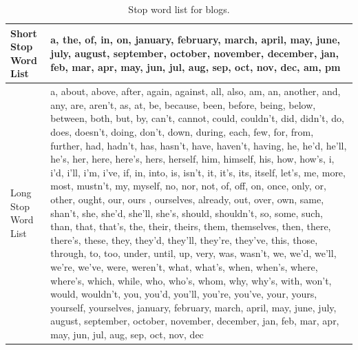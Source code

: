 \documentclass{sig-alternate}
\begin{document}
\begin{table}[ht]
\begin{center}
\begin{tabular}{p{0.7cm}|p{7.6cm}}

\hline

\hline
Short Stop Word List & a, the, of, in, on, january, february, march, april, may, june, july, august, september, october, november, december, jan, feb, mar, apr, may, jun, jul, aug, sep, oct, nov, dec, am, pm \\
\hline
Long Stop Word List & a, about, above, after, again, against, all, also, am, an, another, and, any, are, aren't, as, at, be, because, been, before, being, below, between, both, but, by, can't, cannot, could, couldn't, did, didn't, do, does, doesn't, doing, don't, down, during, each, few, for, from, further, had, hadn't, has, hasn't, have, haven't, having, he, he'd, he'll, he's, her, here, here's, hers, herself, him, himself, his, how, how's, i, i'd, i'll, i'm, i've, if, in, into, is, isn't, it, it's, its, itself, let's, me, more, most, mustn't, my, myself, no, nor, not, of, off, on, once, only, or, other, ought, our, ours , ourselves, already, out, over, own, same, shan't, she, she'd, she'll, she's, should, shouldn't, so, some, such, than, that, that's, the, their, theirs, them, themselves, then, there, there's, these, they, they'd, they'll, they're, they've, this, those, through, to, too, under, until, up, very, was, wasn't, we, we'd, we'll, we're, we've, were, weren't, what, what's, when, when's, where, where's, which, while, who, who's, whom, why, why's, with, won't, would, wouldn't, you, you'd, you'll, you're, you've, your, yours, yourself, yourselves, january, february, march, april, may, june, july, august, september, october, november, december, jan, feb, mar, apr, may, jun, jul, aug, sep, oct, nov, dec\\

\hline
\end{tabular}
\caption{Stop word list for blogs.}
\label{table:stopwords}
\end{center}
\end{table}
\end{document}
